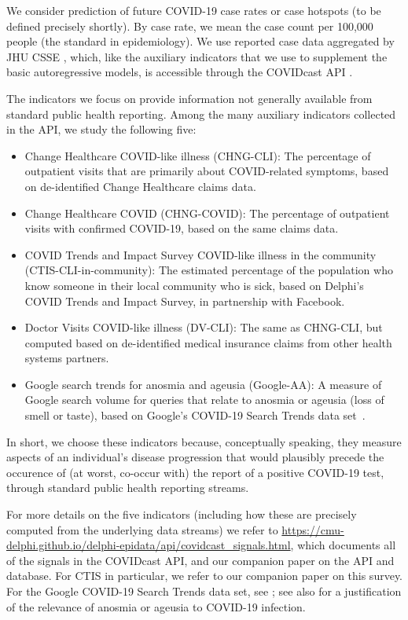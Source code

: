 \documentclass[9pt,twocolumn,twoside,lineno]{pnas-new}
\begin{document}
We consider prediction of future COVID-19 case rates or case hotspots (to be
defined precisely shortly).  By case rate, we mean the case count per 100,000
people (the standard in epidemiology).  We use reported case data aggregated by 
JHU CSSE \cite{Dong:2020}, which, like the auxiliary indicators that we use to
supplement the basic autoregressive models, is accessible through the COVIDcast
API \cite{CovidcastAPI}. 

The indicators we focus on provide information not generally available from
standard public health reporting. Among the many auxiliary indicators collected
in the API, we study the following five:  
\begin{itemize}
\item Change Healthcare COVID-like illness (CHNG-CLI): The percentage of
  outpatient visits that are primarily about COVID-related symptoms, based on
  de-identified Change Healthcare claims data.
\item Change Healthcare COVID (CHNG-COVID): The percentage of outpatient visits
  with confirmed COVID-19, based on the same claims data.
\item COVID Trends and Impact Survey COVID-like illness in the community
  (CTIS-CLI-in-community): The estimated percentage of the population who know
  someone in their local community who is sick, based on Delphi's COVID Trends
  and Impact Survey, in partnership with Facebook.
\item Doctor Visits COVID-like illness (DV-CLI): The same as CHNG-CLI, but
  computed based on de-identified medical insurance claims from other health
  systems partners.  
\item Google search trends for anosmia and ageusia (Google-AA): A measure of  
  Google search volume for queries that relate to anosmia or ageusia (loss of
  smell or taste), based on Google's COVID-19 Search Trends data
  set~\cite{GoogleSymptoms}.   
\end{itemize}
In short, we choose these indicators because, conceptually speaking, they
measure aspects of an individual's disease progression that would plausibly
precede the occurence of (at worst, co-occur  with) the report of a positive
COVID-19 test, through standard public health reporting streams.

For more details on the five indicators (including how these are precisely
computed from the underlying data streams) we refer to
\url{https://cmu-delphi.github.io/delphi-epidata/api/covidcast_signals.html},
which documents all of the signals in the COVIDcast API, and our companion paper
on the API and database. For CTIS in particular, we refer to our companion paper
on this survey. For the Google COVID-19 Search Trends data set, see
\cite{GoogleSymptoms}; see also \cite{Klopfen:2020, Vaira:2020} for a 
justification of the relevance of anosmia or ageusia to COVID-19 infection. 
\end{document}
